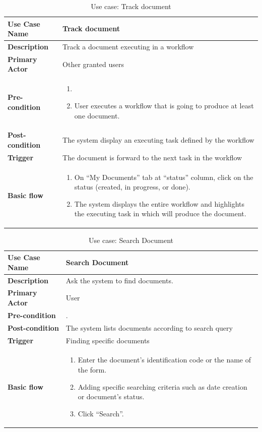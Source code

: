 \begin{table}
	\centering
	\caption{Use case: Track document}
	\begin{tabular}{|l|L{9cm}|}
		\hline
		\textbf{Use Case Name} & Track document \\
		\hline
		
		\textbf{Description} & Track a document executing in a workflow \\
		\textbf{Primary Actor} & Other granted users \\
		\textbf{Pre-condition} & 
		\begin{enumerate}
			\item \alreadylogin
			\item User executes a workflow that is going to produce at least one document.
		\end{enumerate} \\
		\textbf{Post-condition} & The system display an executing task defined by the workflow \\
		\textbf{Trigger} & The document is forward to the next task in the workflow \\
		\textbf{Basic flow} & 
		\begin{enumerate}
			\item On \enquote{My Documents} tab at \enquote{status} column, click on the status (created, in progress, or done).
			\item The system displays the entire workflow and highlights the executing task in which will produce the document.
		\end{enumerate} \\
		\hline
	\end{tabular}
\end{table}

\begin{table}
	\centering
	\caption{Use case: Search Document}
	\begin{tabular}{|l|L{9cm}|}
		\hline
		\textbf{Use Case Name} & Search Document \\
		\hline
		
		\textbf{Description} & Ask the system to find documents. \\
		\textbf{Primary Actor} & User \\
		\textbf{Pre-condition} & \alreadylogin. \\
		\textbf{Post-condition} & The system lists documents according to search query \\
		\textbf{Trigger} & Finding specific documents \\
		\textbf{Basic flow} & 
		\begin{enumerate}
			\item Enter the document's identification code or the name of the form.
			\item Adding specific searching criteria such as date creation or document's status.
			\item Click \enquote{Search}.
		\end{enumerate} \\
		\hline
	\end{tabular}
\end{table}
